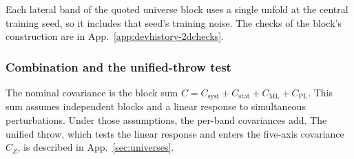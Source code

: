 Each lateral band of the quoted universe block uses a single unfold at the central training seed, so it includes that seed's training noise. The checks of the block's construction are in App.~\ref{app:devhistory-2dchecks}.

\subsubsection{Combination and the unified-throw test}
\label{sec:uq-combine}
The nominal covariance is the block sum $C = C_{\mathrm{syst}} + C_{\mathrm{stat}} + C_{\mathrm{ML}} + C_{\mathrm{PL}}$. This sum assumes independent blocks and a linear response to simultaneous perturbations. Under those assumptions, the per-band covariances add. The unified throw, which tests the linear response and enters the five-axis covariance $C_Z$, is described in App.~\ref{sec:universes}.


